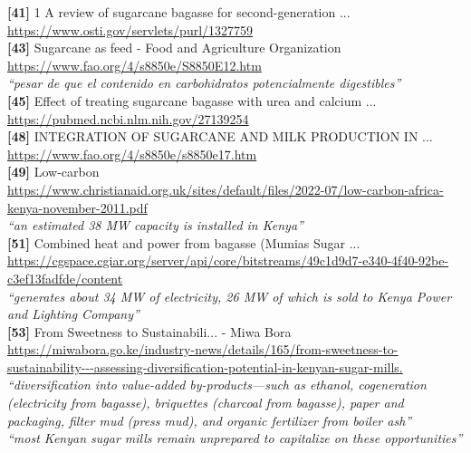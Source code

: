 \textbf{[41]} 1 A review of sugarcane bagasse for second-generation ...\\[0.15em]
\url{https://www.osti.gov/servlets/purl/1327759}\\[0.2em]

\textbf{[43]} Sugarcane as feed - Food and Agriculture Organization\\[0.15em]
\url{https://www.fao.org/4/s8850e/S8850E12.htm}\\[0.2em]
\emph{``pesar de que el contenido en carbohidratos potencialmente digestibles''}\\[0.45em]

\textbf{[45]} Effect of treating sugarcane bagasse with urea and calcium ...\\[0.15em]
\url{https://pubmed.ncbi.nlm.nih.gov/27139254}\\[0.2em]

\textbf{[48]} INTEGRATION OF SUGARCANE AND MILK PRODUCTION IN ...\\[0.15em]
\url{https://www.fao.org/4/s8850e/s8850e17.htm}\\[0.2em]

\textbf{[49]} Low-carbon\\[0.15em]
\url{https://www.christianaid.org.uk/sites/default/files/2022-07/low-carbon-africa-kenya-november-2011.pdf}\\[0.2em]
\emph{``an estimated 38 MW capacity is installed in Kenya''}\\[0.45em]

\textbf{[51]} Combined heat and power from bagasse (Mumias Sugar ...\\[0.15em]
\url{https://cgspace.cgiar.org/server/api/core/bitstreams/49c1d9d7-e340-4f40-92be-c3ef13fadfde/content}\\[0.2em]
\emph{``generates about 34 MW of electricity, 26 MW of which is sold to Kenya Power and Lighting Company''}\\[0.45em]

\textbf{[53]} From Sweetness to Sustainabili... - Miwa Bora\\[0.15em]
\url{https://miwabora.go.ke/industry-news/details/165/from-sweetness-to-sustainability---assessing-diversification-potential-in-kenyan-sugar-mills.}\\[0.2em]
\emph{``diversification into value-added by-products—such as ethanol, cogeneration (electricity from bagasse), briquettes (charcoal from bagasse), paper and packaging, filter mud (press mud), and organic fertilizer from boiler ash''}\\[0.45em]
\emph{``most Kenyan sugar mills remain unprepared to capitalize on these opportunities''}\\[0.45em]

